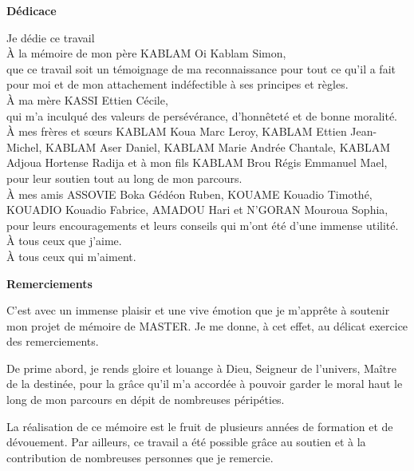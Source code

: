 \begin{center}
	\LARGE{\textbf{Dédicace}}
\end{center}

\begin{center}
	Je dédie ce travail\\
	\uppercase{à} la mémoire de mon père KABLAM Oi Kablam Simon,\\ que ce travail soit un témoignage de ma reconnaissance pour tout ce qu'il a fait pour moi et de mon attachement indéfectible à ses principes et règles. \\
	\uppercase{à} ma mère KASSI Ettien Cécile,\\ qui m'a inculqué des valeurs de persévérance, d'honnêteté et de bonne moralité. \\
	\uppercase{à} mes frères et sœurs KABLAM Koua Marc Leroy, KABLAM Ettien Jean-Michel, KABLAM Aser Daniel, KABLAM Marie Andrée Chantale, KABLAM Adjoua Hortense Radija et à mon fils KABLAM Brou Régis Emmanuel Mael,\\ pour leur soutien tout au long de mon parcours.\\
	\uppercase{à} mes amis ASSOVIE Boka Gédéon Ruben, KOUAME Kouadio Timothé, KOUADIO Kouadio Fabrice, AMADOU Hari et N'GORAN Mouroua Sophia,\\ pour leurs encouragements et leurs conseils qui m'ont été d'une immense utilité.\\
	\uppercase{à} tous ceux que j'aime.\\
	\uppercase{à} tous ceux qui m'aiment.
	
	
\end{center} 

\newpage
{}
\begin{center}
	\LARGE{\textbf{Remerciements}}
\end{center}
C'est avec un immense plaisir et une vive émotion que je m'apprête à soutenir mon projet de mémoire de MASTER. Je me donne, à cet effet, au délicat exercice des remerciements.

De prime abord, je rends gloire et louange à Dieu, Seigneur de l'univers, Maître de la destinée, pour la grâce qu'il m'a accordée à pouvoir garder le moral haut le long de mon parcours en dépit de nombreuses péripéties.

La réalisation de ce mémoire est le fruit de plusieurs années de formation et de dévouement. 
Par ailleurs, ce travail a été possible grâce au soutien et à la contribution de nombreuses personnes que je remercie.


